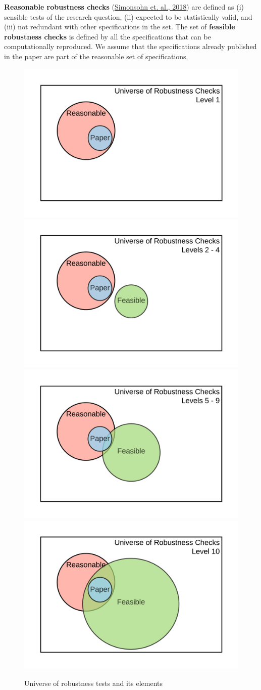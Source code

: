 \documentclass[]{book}
\begin{document}
\textbf{Reasonable robustness checks} (\href{https://urisohn.com/sohn_files/wp/wordpress/wp-content/uploads/Paper-Specification-curve-2018-11-02.pdf}{Simonsohn et. al., 2018}) are defined as (i) sensible tests of the research question, (ii) expected to be statistically valid, and (iii) not redundant with other specifications in the set. The set of \textbf{feasible robustness checks} is defined by all the specifications that can be computationally reproduced. We assume that the specifications already published in the paper are part of the reasonable set of specifications.

\begin{figure}
\includegraphics[width=0.5\linewidth]{robustness_lvl1} \includegraphics[width=0.5\linewidth]{robustness_lvl2_4} \includegraphics[width=0.5\linewidth]{robustness_lvl5-9} \includegraphics[width=0.5\linewidth]{robustness_lvl10} \caption{Universe of robustness tests and its elements}\label{fig:robusts}
\end{figure}
\end{document}
